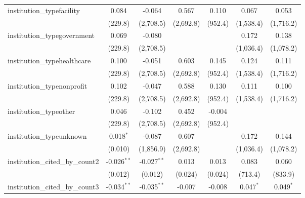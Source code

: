 \begin{tabular}{lcccccc}
   institution\_typefacility             & 0.084          & -0.064        & 0.567          & 0.110         & 0.067         & 0.053\\   
                                         & (229.8)        & (2,708.5)     & (2,692.8)      & (952.4)       & (1,538.4)     & (1,716.2)\\   
   institution\_typegovernment           & 0.069          & -0.080        &                &               & 0.172         & 0.138\\   
                                         & (229.8)        & (2,708.5)     &                &               & (1,036.4)     & (1,078.2)\\   
   institution\_typehealthcare           & 0.100          & -0.051        & 0.603          & 0.145         & 0.124         & 0.111\\   
                                         & (229.8)        & (2,708.5)     & (2,692.8)      & (952.4)       & (1,538.4)     & (1,716.2)\\   
   institution\_typenonprofit            & 0.102          & -0.047        & 0.588          & 0.130         & 0.111         & 0.100\\   
                                         & (229.8)        & (2,708.5)     & (2,692.8)      & (952.4)       & (1,538.4)     & (1,716.2)\\   
   institution\_typeother                & 0.046          & -0.102        & 0.452          & -0.004        &               &   \\   
                                         & (229.8)        & (2,708.5)     & (2,692.8)      & (952.4)       &               &   \\   
   institution\_typeunknown              & 0.018$^{*}$    & -0.087        & 0.607          &               & 0.172         & 0.144\\   
                                         & (0.010)        & (1,856.9)     & (2,692.8)      &               & (1,036.4)     & (1,078.2)\\   
   institution\_cited\_by\_count2        & -0.026$^{**}$  & -0.027$^{**}$ & 0.013          & 0.013         & 0.083         & 0.060\\   
                                         & (0.012)        & (0.012)       & (0.024)        & (0.024)       & (713.4)       & (833.9)\\   
   institution\_cited\_by\_count3        & -0.034$^{**}$  & -0.035$^{**}$ & -0.007         & -0.008        & 0.047$^{*}$   & 0.049$^{*}$\\   

\end{tabular}
